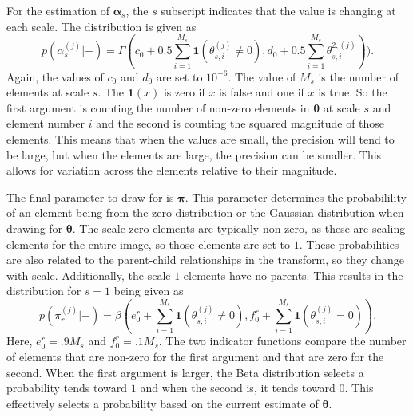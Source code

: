 \documentclass{IEEEtran}
\begin{document}
For the estimation of $\mathbf{\alpha}_s$, the $s$ subscript indicates
that the value is changing at each scale.  The distribution is given
as 
\begin{equation}
    p(\alpha_s^{(j)}|-) =  \Gamma(c_0+0.5\sum_{i=1}^{M_s}\mathbf{1}(\theta_{s,i}^{(j)}\neq
    0), d_0+0.5\sum_{i=1}^{M_s}\theta_{s,i}^{2,(j)})).
\label{alphas}
\end{equation}
Again, the values of $c_0$ and $d_0$ are set to $10^{-6}$.  The value
of $M_s$ is the number of elements at scale $s$.  The
$\mathbf{1}(x)$ is zero if $x$ is false and one if $x$ is true.  So
the first argument is counting the number of non-zero elements in
$\mathbf{\theta}$ at scale $s$ and element number $i$ and the
second is counting the squared magnitude of those elements.  This
means that when the values are small, the precision will tend to be
large, but when the elements are large, the precision can be smaller.
This allows for variation across the elements relative to their
magnitude.

The final parameter to draw for is $\mathbf{\pi}$.  This parameter
determines the probabilility of an element being from the zero
distribution or the Gaussian distribution when drawing for
$\mathbf{\theta}$.  The scale zero elements are typically non-zero, as
these are scaling elements for the entire image, so those elements are
set to $1$.  These probabilities are also related to the parent-child
relationships in the transform, so they change with scale.
Additionally, the scale $1$ elements have no parents.  This results in
the distribution for $s=1$ being given as
\begin{equation}
    p(\pi_r^{(j)}|-)  = 
    \beta(e_0^r+\sum_{i=1}^{M_s}\mathbf{1}(\theta_{s,i}^{(j)}\neq
    0), f_0^r +\sum_{i=1}^{M_s}\mathbf{1}(\theta_{s,i}^{(j)}= 0)).
\label{pir}
\end{equation}
Here, $e_0^r = .9M_s$ and $f_0^r = .1M_s$.  The two indicator functions compare the number of elements that are
non-zero for the first argument and that are zero for the second.
When the first argument is larger, the Beta distribution selects a probability tends toward $1$
and when the second is, it tends toward $0$.  This effectively selects
a probability based on the current estimate of $\mathbf{\theta}$.
\end{document}
